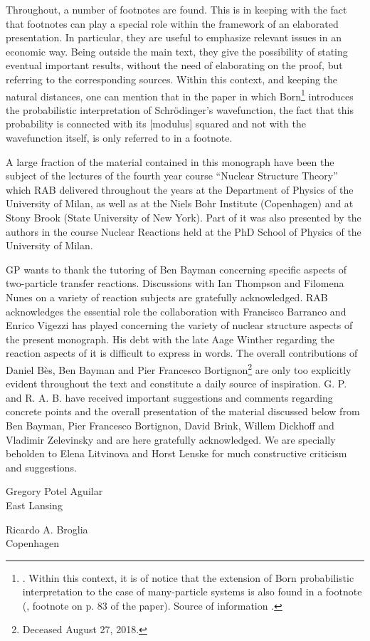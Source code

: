 Throughout, a number of footnotes are found. This is in keeping with the fact that footnotes can play a special role within the framework of an elaborated presentation. In particular, they are useful to emphasize relevant issues in an economic way. Being outside the main text, they give the possibility of stating eventual important results, without the need of elaborating on the proof, but referring to the corresponding sources.
 Within this context, and keeping the natural distances, one can mention that in the paper  in which Born\footnote{\cite{Born:26}. Within this context, it is of notice that the extension of Born probabilistic interpretation to the case of many-particle systems is also found in a footnote (\cite{Pauli:27}, footnote on p. 83 of the paper). Source of information \cite{Pais:86}.} introduces the probabilistic interpretation of Schr\"odinger's  wavefunction, the fact that this probability is connected with its [modulus] squared and not with the wavefunction itself, is only referred to in a footnote.



  A large fraction of the material contained in this monograph have been the subject of the lectures of the fourth year course ``Nuclear Structure Theory'' which RAB delivered throughout the years at the Department of Physics of the University of Milan, as well as at the Niels Bohr Institute (Copenhagen) and at Stony Brook (State University of New York). Part of it was also presented by the authors in the course Nuclear Reactions held at the PhD School of Physics of the University of Milan.

GP wants to thank the tutoring of  Ben Bayman concerning specific aspects of two-particle transfer reactions. Discussions with Ian Thompson and Filomena Nunes on a variety of reaction subjects are gratefully acknowledged. 
RAB  acknowledges the essential role the collaboration with Francisco Barranco and Enrico Vigezzi has played concerning the variety of nuclear structure aspects of the present monograph. His debt with the late Aage Winther regarding the reaction aspects of it is difficult to express in words. The overall contributions of Daniel B\`{e}s, Ben Bayman and Pier Francesco Bortignon\footnote{Deceased August 27, 2018.} are only too explicitly evident throughout the text and constitute a daily source of inspiration.  G. P. and R. A. B. have received important suggestions and comments regarding concrete points and the overall presentation of the material discussed below from Ben Bayman, Pier Francesco Bortignon, David Brink, Willem Dickhoff and Vladimir Zelevinsky and are here gratefully acknowledged. We are specially beholden to Elena Litvinova and Horst Lenske for much constructive criticism and suggestions.
\begin{flushleft}
Gregory Potel Aguilar\\
 East Lansing
\end{flushleft}
\vspace{-1.7cm}
\begin{flushright}
Ricardo A. Broglia\\
 Copenhagen
\end{flushright}

%
%
